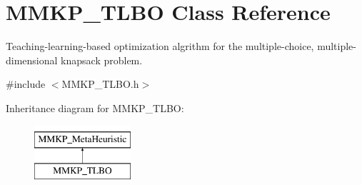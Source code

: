 \hypertarget{class_m_m_k_p___t_l_b_o}{\section{M\+M\+K\+P\+\_\+\+T\+L\+B\+O Class Reference}
\label{class_m_m_k_p___t_l_b_o}
}


Teaching-\/learning-\/based optimization algrithm for the multiple-\/choice, multiple-\/dimensional knapsack problem.  




{\ttfamily \#include $<$M\+M\+K\+P\+\_\+\+T\+L\+B\+O.\+h$>$}

Inheritance diagram for M\+M\+K\+P\+\_\+\+T\+L\+B\+O\+:\begin{figure}[H]
\begin{center}
\leavevmode
\includegraphics[height=2.000000cm]{class_m_m_k_p___t_l_b_o}
\end{center}
\end{figure}
